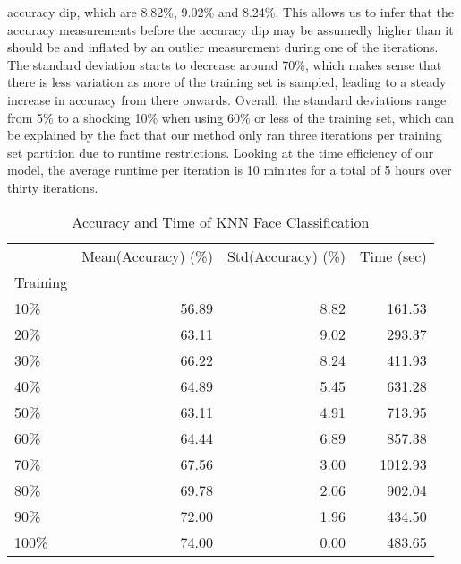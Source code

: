 \documentclass[10pt,parskip=half,
toc=sectionentrywithdots,
bibliography=totocnumbered,
captions=tableheading,numbers=noendperiod]{scrartcl}
\begin{document}
accuracy dip, which are 8.82\%, 9.02\% and 8.24\%. This allows us to
infer that the accuracy measurements before the accuracy dip may be
assumedly higher than it should be and inflated by an outlier
measurement during one of the iterations. The standard deviation starts
to decrease around 70\%, which makes sense that there is less variation
as more of the training set is sampled, leading to a steady increase in
accuracy from there onwards. Overall, the standard deviations range from
5\% to a shocking 10\% when using 60\% or less of the training set,
which can be explained by the fact that our method only ran three
iterations per training set partition due to runtime restrictions.
Looking at the time efficiency of our model, the average runtime per
iteration is 10 minutes for a total of 5 hours over thirty iterations.

\begin{table}[H]
\caption{Accuracy and Time of KNN Face Classification}\label{tbl:tlabel}
\centering
\begin{adjustbox}{max width=\textwidth}
\begin{tabular}{lrrr}
\toprule
{} &  Mean(Accuracy) (\%) &  Std(Accuracy) (\%) &  Time (sec) \\
Training &                     &                    &             \\
\midrule
10\%      &               56.89 &               8.82 &      161.53 \\
20\%      &               63.11 &               9.02 &      293.37 \\
30\%      &               66.22 &               8.24 &      411.93 \\
40\%      &               64.89 &               5.45 &      631.28 \\
50\%      &               63.11 &               4.91 &      713.95 \\
60\%      &               64.44 &               6.89 &      857.38 \\
70\%      &               67.56 &               3.00 &     1012.93 \\
80\%      &               69.78 &               2.06 &      902.04 \\
90\%      &               72.00 &               1.96 &      434.50 \\
100\%     &               74.00 &               0.00 &      483.65 \\
\bottomrule
\end{tabular}

\end{adjustbox}
\end{table}
\end{document}
